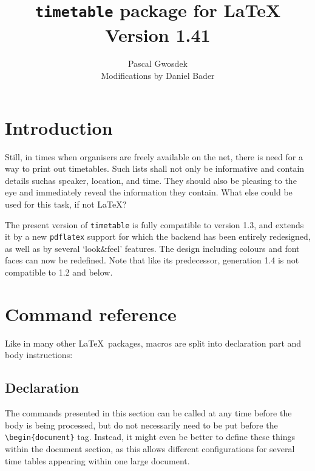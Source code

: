 \documentclass[a4paper,10pt]{article}
\title{\texttt{timetable} package for \LaTeX\\\normalsize Version 1.41}
\author{Pascal Gwosdek\\\small Modifications by Daniel Bader}
\begin{document}
\maketitle

\section{Introduction}
Still, in times when organisers are freely available on the net, there is need for a way to print out timetables. Such lists shall not only be informative and contain details suchas speaker, location, and time. They should also be pleasing to the eye and immediately reveal the information they contain. What else could be used for this task, if not \LaTeX?

The present version of \texttt{timetable} is fully compatible to version 1.3, and extends it by a new \texttt{pdflatex} support for which the backend has been entirely redesigned, as well as by several `look\&feel' features. The design including colours and font faces can now be redefined. Note that like its predecessor, generation 1.4 is not compatible to 1.2 and below.

\section{Command reference}
Like in many other \LaTeX\ packages, macros are split into declaration part and body instructions:

\subsection{Declaration}
The commands presented in this section can be called at any time before the body is being processed, but do not necessarily need to be put before the \lstinline{\begin}\texttt{\{document\}} tag. Instead, it might even be better to define these things within the document section, as this allows different configurations for several time tables appearing within one large document.
\end{document}
